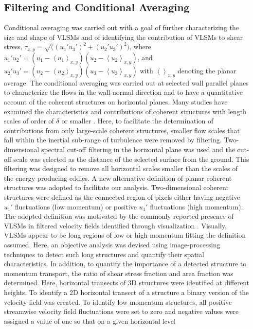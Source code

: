 \subsection{Filtering and Conditional Averaging}
Conditional averaging was carried out with a goal of further characterizing the size and shape of VLSMs and of identifying the contribution of VLSMs to shear stress, $\tau_{x,y} = \sqrt((u_{1}'u_{3}')^2+(u_{2}'u_{3}')^2)$, where $u_{1}'u_{2}'= (u_{1} -\left< u_{1}\right >_{x,y})(u_{2} -\left< u_{2}\right >_{x,y})$, and $u_{2}'u_{3}'= (u_2 -\left< u_{2}\right >_{x,y})(u_{3} -\left< u_{3}\right >_{x,y})$ with $\left < \right >_{x,y}$ denoting the planar average. The conditional averaging was carried out at selected wall parallel planes to characterize the flows in the wall-normal direction and to have a quantitative account of the coherent structures on horizontal planes. Many studies have examined  the characteristics and contributions of coherent structures with length scales of order of $\delta$ or smaller \cite{}. Here, to facilitate the determination of contributions from only large-scale coherent structures, smaller flow scales that  fall within the inertial sub-range of turbulence were removed by filtering.  Two-dimensional spectral cut-off filtering in the horizontal plane was used and the cut-off scale was selected as the distance of the selected surface from the ground. This filtering was designed to remove all horizontal scales smaller than the scales  of the energy producing eddies.  A new alternative definition of planar coherent structures was adopted to facilitate our analysis. Two-dimensional coherent structures were defined as the connected region of pixels either having negative $u_{1}'$ fluctuations (low momentum) or positive $u_{1}'$ fluctuations (high momentum). The adopted definition was motivated by the commonly reported presence of VLSMs in filtered velocity fields identified through visualization \cite{hutchins_marusic_jfm2007,dennis_nickels_jfm2011}.  Visually, VLSMs appear to be long regions of low or high momentum fitting the definition assumed.  Here, an objective analysis was devised using image-processing techniques to detect such long structures and quantify their spatial characteristics. In addition, to quantify the importance of a detected structure to momentum transport, the ratio of shear stress fraction and area fraction was determined.  Here, horizontal transects of 3D structures were identified at different heights. To identify a 2D horizontal transect of a structure a binary version of the velocity field was created. To identify low-momentum structures, all positive streamwise velocity field fluctuations were set to zero and negative values were assigned a value of one so that on a given horizontal level 

